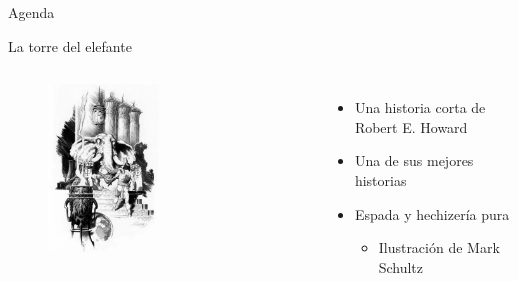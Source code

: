 \begin{frame}{}
    \maketitle
\end{frame}

\begin{frame}{Agenda}
    \tableofcontents
\end{frame}

\begin{frame}{La torre del elefante}
\begin{columns}
 \begin{figure}[htb]
  \centering
  \includegraphics[width=0.5\textwidth]{img/Intro}
\end{figure}    
     \begin{itemize}
         \item Una historia corta de Robert E. Howard
         \item Una de sus mejores historias
         \item Espada y hechizería pura
         \begin{itemize}
          \item Ilustración de Mark Schultz
         \end{itemize}
     \end{itemize}
\end{columns}
\end{frame}

